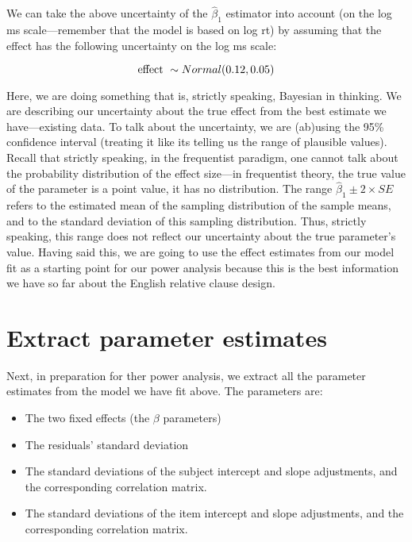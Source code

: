 \documentclass[12pt,]{krantz}
\providecommand{\tightlist}{%
  \setlength{\itemsep}{0pt}\setlength{\parskip}{0pt}}
\begin{document}
We can take the above uncertainty of the \(\hat\beta_1\) estimator into account (on the log ms scale---remember that the model is based on log rt) by assuming that the effect has the following uncertainty on the log ms scale:

\begin{equation}
\hbox{effect } \sim Normal(0.12,0.05)
\end{equation}

Here, we are doing something that is, strictly speaking, Bayesian in thinking. We are describing our uncertainty about the true effect from the best estimate we have---existing data. To talk about the uncertainty, we are (ab)using the 95\% confidence interval (treating it like its telling us the range of plausible values). Recall that strictly speaking, in the frequentist paradigm, one cannot talk about the probability distribution of the effect size---in frequentist theory, the true value of the parameter is a point value, it has no distribution. The range \(\hat\beta_1 \pm 2\times SE\) refers to the estimated mean of the sampling distribution of the sample means, and to the standard deviation of this sampling distribution. Thus, strictly speaking, this range does not reflect our uncertainty about the true parameter's value. Having said this, we are going to use the effect estimates from our model fit as a starting point for our power analysis because this is the best information we have so far about the English relative clause design.

\hypertarget{extract-parameter-estimates}{%
\section{Extract parameter estimates}\label{extract-parameter-estimates}}

Next, in preparation for ther power analysis, we extract all the parameter estimates from the model we have fit above. The parameters are:

\begin{itemize}
\tightlist
\item
  The two fixed effects (the \(\beta\) parameters)
\item
  The residuals' standard deviation
\item
  The standard deviations of the subject intercept and slope adjustments, and the corresponding correlation matrix.
\item
  The standard deviations of the item intercept and slope adjustments, and the corresponding correlation matrix.
\end{itemize}
\end{document}
